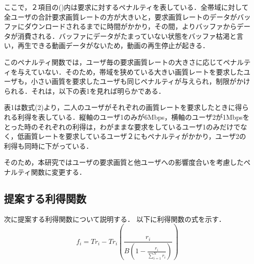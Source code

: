\documentclass[rinkou,a4paper,uplatex]{ieicej}
\begin{document}
ここで，２項目の()内は要求に対するペナルティを表している．全帯域に対して全ユーザの合計要求画質レートの方が大きいと，要求画質レートのデータがバッファにダウンロードされるまでに時間がかかり，その間，よりバッファからデータが消費される．バッファにデータがたまっていない状態をバッファ枯渇と言い，再生できる動画データがないため，動画の再生停止が起きる．

このペナルティ関数では，ユーザ毎の要求画質レートの大きさに応じてペナルティを与えていない．そのため，帯域を狭めている大きい画質レートを要求したユーザも，小さい画質を要求したユーザも同じペナルティが与えられ，制限がかけられる．それは，以下の表1を見れば明らかである．

\begin{table}[h]
    \centering
    \caption{既存研究の利得表（一部抜粋）}
\end{table}


表1は数式(2)より，二人のユーザがそれぞれの画質レートを要求したときに得られる利得を表している．縦軸のユーザ1のみが6Mbps，横軸のユーザ2が1Mbpsをとった時のそれぞれの利得は，わがままな要求をしているユーザ1のみだけでなく，低画質レートを要求しているユーザ２にもペナルティがかかり，ユーザ2の利得も同時に下がっている．

そのため，本研究ではユーザの要求画質と他ユーザへの影響度合いを考慮したペナルティ関数に変更する．

\subsection{提案する利得関数}
次に提案する利得関数について説明する．
以下に利得関数の式を示す．
\begin{equation}
 f_i=Tr_i-Tr_i(\frac{r_i}{B(1-\frac{r_i}{\sum^N_{i=1}r_i})})
\end{equation}
\end{document}
